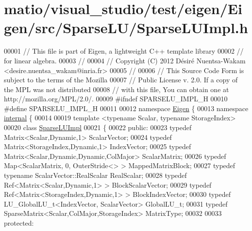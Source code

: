 \hypertarget{matio_2visual__studio_2test_2eigen_2_eigen_2src_2_sparse_l_u_2_sparse_l_u_impl_8h_source}{}\section{matio/visual\+\_\+studio/test/eigen/\+Eigen/src/\+Sparse\+L\+U/\+Sparse\+L\+U\+Impl.h}
\label{matio_2visual__studio_2test_2eigen_2_eigen_2src_2_sparse_l_u_2_sparse_l_u_impl_8h_source}

\begin{DoxyCode}
00001 \textcolor{comment}{// This file is part of Eigen, a lightweight C++ template library}
00002 \textcolor{comment}{// for linear algebra.}
00003 \textcolor{comment}{//}
00004 \textcolor{comment}{// Copyright (C) 2012 Désiré Nuentsa-Wakam <desire.nuentsa\_wakam@inria.fr>}
00005 \textcolor{comment}{//}
00006 \textcolor{comment}{// This Source Code Form is subject to the terms of the Mozilla}
00007 \textcolor{comment}{// Public License v. 2.0. If a copy of the MPL was not distributed}
00008 \textcolor{comment}{// with this file, You can obtain one at http://mozilla.org/MPL/2.0/.}
00009 \textcolor{preprocessor}{#ifndef SPARSELU\_IMPL\_H}
00010 \textcolor{preprocessor}{#define SPARSELU\_IMPL\_H}
00011 
00012 \textcolor{keyword}{namespace }\hyperlink{namespace_eigen}{Eigen} \{
00013 \textcolor{keyword}{namespace }\hyperlink{namespaceinternal}{internal} \{
00014   
00019 \textcolor{keyword}{template} <\textcolor{keyword}{typename} Scalar, \textcolor{keyword}{typename} StorageIndex>
00020 \textcolor{keyword}{class }\hyperlink{class_sparse_l_u_impl}{SparseLUImpl}
00021 \{
00022   \textcolor{keyword}{public}:
00023     \textcolor{keyword}{typedef} Matrix<Scalar,Dynamic,1> ScalarVector;
00024     \textcolor{keyword}{typedef} Matrix<StorageIndex,Dynamic,1> IndexVector; 
00025     \textcolor{keyword}{typedef} Matrix<Scalar,Dynamic,Dynamic,ColMajor> ScalarMatrix;
00026     \textcolor{keyword}{typedef} Map<ScalarMatrix, 0,  OuterStride<> > MappedMatrixBlock;
00027     \textcolor{keyword}{typedef} \textcolor{keyword}{typename} ScalarVector::RealScalar RealScalar; 
00028     \textcolor{keyword}{typedef} Ref<Matrix<Scalar,Dynamic,1> > BlockScalarVector;
00029     \textcolor{keyword}{typedef} Ref<Matrix<StorageIndex,Dynamic,1> > BlockIndexVector;
00030     \textcolor{keyword}{typedef} LU\_GlobalLU\_t<IndexVector, ScalarVector> GlobalLU\_t; 
00031     \textcolor{keyword}{typedef} SparseMatrix<Scalar,ColMajor,StorageIndex> MatrixType; 
00032     
00033   \textcolor{keyword}{protected}:

\end{DoxyCode}
